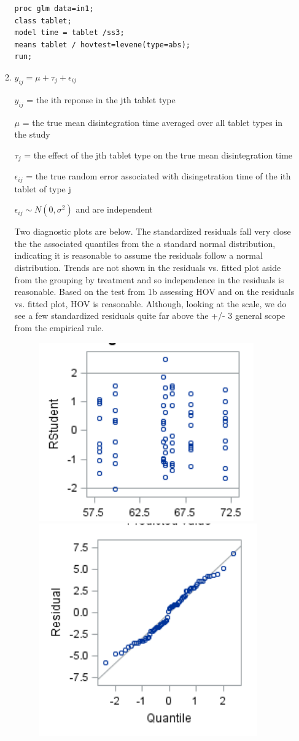 \documentclass{article}\usepackage[]{graphicx}\usepackage[]{color}
\begin{document}
\begin{enumerate}
\begin{enumerate}
\begin{verbatim}
proc glm data=in1;
class tablet;
model time = tablet /ss3;
means tablet / hovtest=levene(type=abs);
run;
\end{verbatim}

\item

$y_{ij} = \mu + \tau_{j} + \epsilon_{ij}$

$y_{ij}$ = the ith reponse in the jth tablet type

$\mu$ = the true mean disintegration time averaged over all tablet types in the study

$\tau_{j}$ = the effect of the jth tablet type on the true mean disintegration time

$\epsilon_{ij}$ = the true random error associated with disingetration time of the ith tablet of type j

$\epsilon_{ij} \sim N(0,\sigma^{2})$ and are independent

Two diagnostic plots are below. The standardized residuals fall very close the the associated quantiles from the a standard normal distribution, indicating it is reasonable to assume the residuals follow a normal distribution. Trends are not shown in the residuals vs. fitted plot aside from the grouping by treatment and so independence in the residuals is reasonable. Based on the test from 1b assessing HOV and on the residuals vs. fitted plot, HOV is reasonable. Although, looking at the scale, we do see a few standardized residuals quite far above the +/- 3 general scope from the empirical rule.

\begin{figure}
\centering
\begin{minipage}{.5\textwidth}
  \centering
  \includegraphics[width=.4\linewidth]{prob1cplots}
  \end{minipage}%
\begin{minipage}{.5\textwidth}
  \centering
  \includegraphics[width=.4\linewidth]{prob1cplots1}
\end{minipage}
\end{figure}


\end{enumerate}
\end{enumerate}
\end{document}
